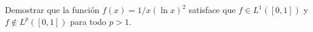 \documentclass{book}
\newcommand{\rr}{\mathbb{R}}
\begin{document}


 \begin{ejer}{}
  Demostrar que la función $f(x)=1 /x(\ln x)^2 $ satisface que $f\in L^1([0,1])$ y $f\notin L^p([0,1])$ para todo $p>1$.
  \end{ejer}
 

\end{document}
